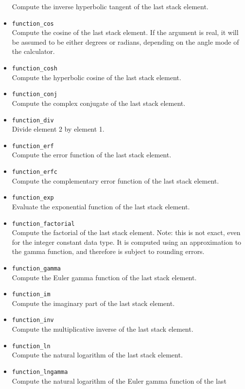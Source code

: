 \documentclass[11pt,notitlepage]{article}
\begin{document}
\begin{itemize}
      Compute the inverse hyperbolic tangent of the last stack element.
   \item {\tt function\_cos} \\
      Compute the cosine of the last stack element.  If the argument is real,
      it will be assumed to be either degrees or radians, depending on the
      angle mode of the calculator.
   \item {\tt function\_cosh} \\
      Compute the hyperbolic cosine of the last stack element.
   \item {\tt function\_conj} \\
      Compute the complex conjugate of the last stack element.
   \item {\tt function\_div} \\
      Divide element 2 by element 1.
   \item {\tt function\_erf} \\
      Compute the error function of the last stack element.
   \item {\tt function\_erfc} \\
      Compute the complementary error function of the last stack element.
   \item {\tt function\_exp} \\
      Evaluate the exponential function of the last stack element.
   \item {\tt function\_factorial} \\
      Compute the factorial of the last stack element.  Note: this is not
      exact, even for the integer constant data type.  It is computed using
      an approximation to the gamma function, and therefore is subject to rounding 
      errors.
   \item {\tt function\_gamma} \\
      Compute the Euler gamma function of the last stack element.
   \item {\tt function\_im} \\
      Compute the imaginary part of the last stack element.
   \item {\tt function\_inv} \\
      Compute the multiplicative inverse of the last stack element.
   \item {\tt function\_ln} \\
      Compute the natural logarithm of the last stack element.
   \item {\tt function\_lngamma} \\
      Compute the natural logarithm of the Euler gamma function of the last

\end{itemize}
\end{document}
